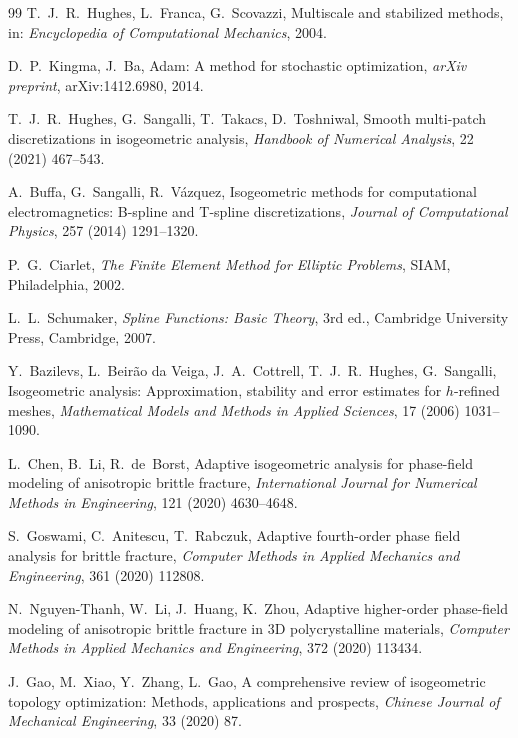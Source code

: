 \documentclass[review]{elsarticle}
\begin{document}
\begin{thebibliography}{99}
T.~J.~R.~Hughes, L.~Franca, G.~Scovazzi,
Multiscale and stabilized methods,
in: \emph{Encyclopedia of Computational Mechanics},
2004.

D.~P.~Kingma, J.~Ba,
Adam: A method for stochastic optimization,
\emph{arXiv preprint},
arXiv:1412.6980, 2014.

T.~J.~R.~Hughes, G.~Sangalli, T.~Takacs, D.~Toshniwal,
Smooth multi-patch discretizations in isogeometric analysis,
\emph{Handbook of Numerical Analysis},
22 (2021) 467--543.

A.~Buffa, G.~Sangalli, R.~V\'azquez,
Isogeometric methods for computational electromagnetics: B-spline and T-spline discretizations,
\emph{Journal of Computational Physics},
257 (2014) 1291--1320.

P.~G.~Ciarlet,
\emph{The Finite Element Method for Elliptic Problems},
SIAM, Philadelphia, 2002.

L.~L.~Schumaker,
\emph{Spline Functions: Basic Theory},
3rd ed.,
Cambridge University Press, Cambridge, 2007.

Y.~Bazilevs, L.~Beir\~ao da Veiga, J.~A.~Cottrell, T.~J.~R.~Hughes, G.~Sangalli,
Isogeometric analysis: Approximation, stability and error estimates for $h$-refined meshes,
\emph{Mathematical Models and Methods in Applied Sciences},
17 (2006) 1031--1090.

L.~Chen, B.~Li, R.~de~Borst,
Adaptive isogeometric analysis for phase-field modeling of anisotropic brittle fracture,
\emph{International Journal for Numerical Methods in Engineering},
121 (2020) 4630--4648.

S.~Goswami, C.~Anitescu, T.~Rabczuk,
Adaptive fourth-order phase field analysis for brittle fracture,
\emph{Computer Methods in Applied Mechanics and Engineering},
361 (2020) 112808.

N.~Nguyen-Thanh, W.~Li, J.~Huang, K.~Zhou,
Adaptive higher-order phase-field modeling of anisotropic brittle fracture in 3D polycrystalline materials,
\emph{Computer Methods in Applied Mechanics and Engineering},
372 (2020) 113434.

J.~Gao, M.~Xiao, Y.~Zhang, L.~Gao,
A comprehensive review of isogeometric topology optimization: Methods, applications and prospects,
\emph{Chinese Journal of Mechanical Engineering},
33 (2020) 87.


\end{thebibliography}
\end{document}
